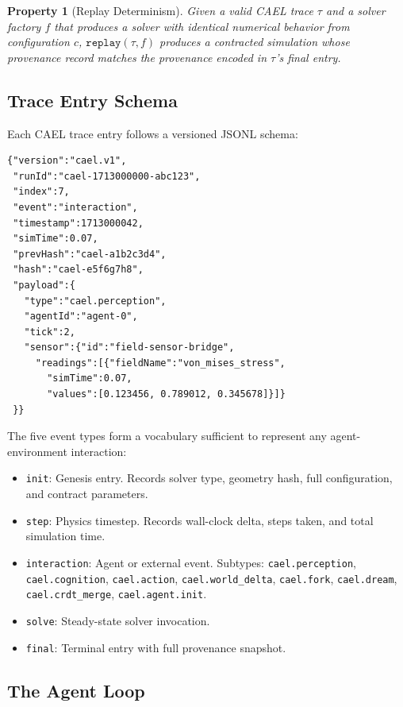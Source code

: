 \documentclass[sigconf,nonacm]{acmart}
\newtheorem{property}{Property}
\begin{document}
\begin{property}[Replay Determinism]
\label{prop:replay}
Given a valid CAEL trace $\tau$ and a solver factory $f$ that
produces a solver with identical numerical behavior from configuration
$c$, $\texttt{replay}(\tau, f)$ produces a contracted simulation
whose provenance record matches the provenance encoded in $\tau$'s
final entry.
\end{property}

\subsection{Trace Entry Schema}

Each CAEL trace entry follows a versioned JSONL schema:

\begin{lstlisting}[language=JSONL,caption={CAEL trace entry (JSONL format)},label=lst:jsonl]
{"version":"cael.v1",
 "runId":"cael-1713000000-abc123",
 "index":7,
 "event":"interaction",
 "timestamp":1713000042,
 "simTime":0.07,
 "prevHash":"cael-a1b2c3d4",
 "hash":"cael-e5f6g7h8",
 "payload":{
   "type":"cael.perception",
   "agentId":"agent-0",
   "tick":2,
   "sensor":{"id":"field-sensor-bridge",
     "readings":[{"fieldName":"von_mises_stress",
       "simTime":0.07,
       "values":[0.123456, 0.789012, 0.345678]}]}
 }}
\end{lstlisting}

The five event types form a vocabulary sufficient to represent
any agent-environment interaction:

\begin{itemize}
  \item \texttt{init}: Genesis entry. Records solver type, geometry
    hash, full configuration, and contract parameters.
  \item \texttt{step}: Physics timestep. Records wall-clock delta,
    steps taken, and total simulation time.
  \item \texttt{interaction}: Agent or external event. Subtypes:
    \texttt{cael.perception}, \texttt{cael.cognition},
    \texttt{cael.action}, \texttt{cael.world\_delta},
    \texttt{cael.fork}, \texttt{cael.dream},
    \texttt{cael.crdt\_merge}, \texttt{cael.agent.init}.
  \item \texttt{solve}: Steady-state solver invocation.
  \item \texttt{final}: Terminal entry with full provenance snapshot.
\end{itemize}

\subsection{The Agent Loop}
\end{document}
